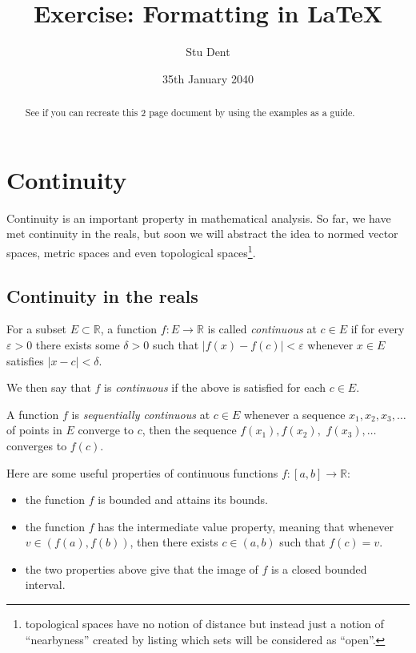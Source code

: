 \documentclass[a4paper,11pt]{article}
\title{Exercise: Formatting in \LaTeX}
\author{Stu Dent}
\date{35th January 2040}
\begin{document}
\maketitle

\begin{abstract}
See if you can recreate this 2 page document by using the examples as a guide.
\end{abstract}

\tableofcontents

\newpage

\section{Continuity\label{sec:continuity}}

Continuity is an important property in mathematical analysis. So far, we have met continuity in the reals, but soon we will abstract the idea to normed vector spaces, metric spaces and even topological spaces\footnote{topological spaces have no notion of distance but instead just a notion of ``nearbyness'' created by listing which sets will be considered as ``open''.}.

\subsection{Continuity in the reals\label{sec:continuity:in-the-reals}}

For a subset $E \subset \mathbb{R}$, a function $f: E \to \mathbb{R}$ is called \textit{continuous} at $c \in E$ if for every $\varepsilon > 0$ there exists some $\delta > 0$ such that $|f(x) - f(c)| < \varepsilon$ whenever $x \in E$ satisfies $|x - c| < \delta$.

We then say that $f$ is \textit{continuous} if the above is satisfied for each $c \in E$.

A function $f$ is \textit{sequentially continuous} at $c \in E$ whenever a sequence $x_1, x_2, x_3, \dots$ of points in $E$ converge to $c$, then the sequence $f(x_1), f(x_2),$ $f(x_3), \dots$ converges to $f(c)$.

Here are some useful properties of continuous functions $f : [a,b] \to \mathbb{R}$:
\begin{itemize}
\item the function $f$ is bounded and attains its bounds.
\item the function $f$ has the intermediate value property, meaning that whenever $v \in (f(a), f(b))$, then there exists $c \in (a,b)$ such that $f(c) = v$. 
\item the two properties above give that the image of $f$ is a closed bounded interval.
\end{itemize}
\end{document}
